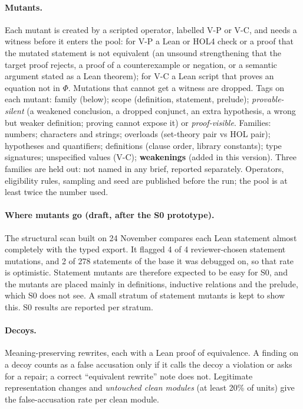 \documentclass[11pt,a4paper]{article}
\begin{document}
\paragraph{Mutants.} Each mutant is created by a scripted operator, labelled V-P or V-C, and needs a witness before it enters the pool: for V-P a Lean or HOL4 check or a proof that the mutated statement is not equivalent (an unsound strengthening that the target proof rejects, a proof of a counterexample or negation, or a semantic argument stated as a Lean theorem); for V-C a Lean script that proves an equation not in $\Phi$. Mutations that cannot get a witness are dropped. Tags on each mutant: family (below); scope (definition, statement, prelude); \emph{provable-silent} (a weakened conclusion, a dropped conjunct, an extra hypothesis, a wrong but weaker definition; proving cannot expose it) or \emph{proof-visible}. Families: numbers; characters and strings; overloads (set-theory pair vs HOL pair); hypotheses and quantifiers; definitions (clause order, library constants); type signatures; unspecified values (V-C); \textbf{weakenings} (added in this version). Three families are held out: not named in any brief, reported separately. Operators, eligibility rules, sampling and seed are published before the run; the pool is at least twice the number used.
\paragraph{Where mutants go (draft, after the S0 prototype).} The structural scan built on 24 November compares each Lean statement almost completely with the typed export. It flagged 4 of 4 reviewer-chosen statement mutations, and 2 of 278 statements of the base it was debugged on, so that rate is optimistic. Statement mutants are therefore expected to be easy for S0, and the mutants are placed mainly in definitions, inductive relations and the prelude, which S0 does not see. A small stratum of statement mutants is kept to show this. S0 results are reported per stratum.

\paragraph{Decoys.} Meaning-preserving rewrites, each with a Lean proof of equivalence. A finding on a decoy counts as a false accusation only if it calls the decoy a violation or asks for a repair; a correct ``equivalent rewrite'' note does not. Legitimate representation changes and \emph{untouched clean modules} (at least 20\% of units) give the false-accusation rate per clean module.
\end{document}
